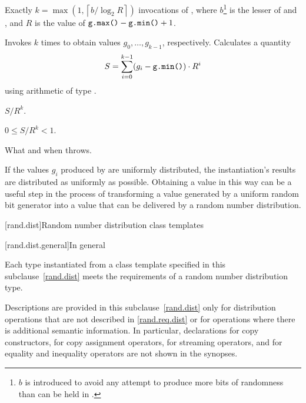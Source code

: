 \begin{itemdescr}
\pnum
\complexity
Exactly
 $k = \max(1, \left\lceil b / \log_2 R \right\rceil)$
 invocations
 of ,
 where $b$\footnote{$b$ is introduced
   to avoid any attempt
   to produce more bits of randomness
   than can be held in .}
   is the lesser of 
                and ,
 and
   $R$ is the value of $\texttt{g.max()} - \texttt{g.min()} + 1$.

\pnum
\effects
 Invokes  $k$ times
 to obtain values $g_0, \dotsc, g_{k-1}$, respectively.
 Calculates a quantity
 \[
   S = \sum_{i=0}^{k-1} (g_i - \texttt{g.min()})
                        \cdot R^i
 \]
 using arithmetic of type
 .

\pnum
\returns
$S / R^k$.
\begin{note}
$0 \leq S / R^k < 1$.
\end{note}

\pnum
\throws
What and when  throws.

\pnum
\begin{note}
If the values $g_i$ produced by  are uniformly distributed,
the instantiation's results are distributed as uniformly as possible.
Obtaining a value in this way
can be a useful step
in the process of transforming
a value generated by a uniform random bit generator
into a value
that can be delivered by a random number distribution.
\end{note}
\end{itemdescr}





[rand.dist]{Random number distribution class templates}%

[rand.dist.general]{In general}

\pnum
Each type instantiated
from a class template specified in this subclause~\ref{rand.dist}
meets the requirements
of a random number distribution type.

\pnum
Descriptions are provided in this subclause~\ref{rand.dist}
only for distribution operations
that are not described in \ref{rand.req.dist}
or for operations where there is additional semantic information.
In particular,
declarations for copy constructors,
for copy assignment operators,
for streaming operators,
and for equality and inequality operators
are not shown in the synopses.

